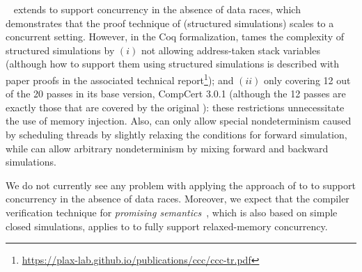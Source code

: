 
\cascc{}~\cite{jiang:cascc} extends \ccc{} to support concurrency in
the absence of data races, which demonstrates that the proof technique
of \ccc{} (\ie structured simulations) scales to a
concurrent setting.  However, in the Coq formalization, \ccc{} tames
the complexity of structured simulations by $(i)$ not allowing
address-taken stack variables (although how to support them using
structured simulations is described with paper proofs in the
associated technical report\footnote{\url{https://plax-lab.github.io/publications/ccc/ccc-tr.pdf}}); and $(ii)$ only
covering 12 out of the 20 passes in its base version, CompCert 3.0.1
(although the 12 passes are exactly those that are covered by the
original \ccc{}): these restrictions unnecessitate the use of memory
injection. Also, \cascc{} can only allow special nondeterminism caused
by scheduling threads by slightly relaxing the conditions for forward
simulation, while \ccm{} can allow arbitrary nondeterminism by mixing
forward and backward simulations.

We do not currently see any problem with applying the approach of
\cascc{} to \ccm{} to support concurrency in the absence of data races.
Moreover, we expect that the compiler verification technique for
\emph{promising semantics}~\cite{Kang:promising}, which is also based
on simple closed simulations, applies to \ccm{} to fully support
relaxed-memory concurrency.

